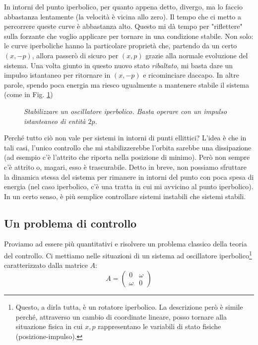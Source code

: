 \documentclass[a4paper,openany]{article}
\begin{document}
	In intorni del punto iperbolico, per quanto appena detto, divergo, ma lo faccio abbastanza lentamente (la velocità è vicina allo zero). Il tempo che ci metto a percorrere queste curve è abbastanza alto. Questo mi dà tempo per "riflettere" sulla forzante che voglio applicare per tornare in una condizione stabile.
	Non solo: le curve iperboliche hanno la particolare proprietà che, partendo da un certo $(x,-p)$, allora passerò di sicuro per $(x,p)$ grazie alla normale evoluzione del sistema. Una volta giunto in questo nuovo stato \textit{ribaltato}, mi basta dare un impulso istantaneo per ritornare in $(x,-p)$ e ricominciare daccapo. In altre parole, spendo poca energia ma riesco ugualmente a mantenere stabile il sistema (come in Fig. \ref{TeoriaContr})
	
	\begin{figure}[H]
		\centering
		\label{TeoriaContr}
		\caption{\textit{Stabilizzare un oscillatore iperbolico. Basta operare con un impulso istanteaneo di entità $2p$.}}
	\end{figure}
	
	
	
	
	Perché tutto ciò non vale per sistemi in intorni di punti ellittici? L'idea è che in tali casi, l'unico controllo che mi stabilizzerebbe l'orbita sarebbe una dissipazione (ad esempio c'è l'attrito che riporta nella posizione di minimo). Però non sempre c'è attrito o, magari, esso è trascurabile. Detto in breve, non possiamo sfruttare la dinamica stessa del sistema per rimanere in intorni del punto con poca spesa di energia (nel caso iperbolico, c'è una tratta in cui mi avvicino al punto iperbolico). In un certo senso, è più semplice controllare sistemi instabili che sistemi stabili.
	\subsection{Un problema di controllo}
	Proviamo ad essere più quantitativi e risolvere un problema classico della teoria del controllo. Ci mettiamo nelle situazioni di un sistema ad oscillatore iperbolico\footnote{Questo, a dirla tutta, è un rotatore iperbolico. La descrizione però è simile perché, attraverso un cambio di coordinate lineare, posso tornare alla situazione fisica in cui $x,p$ rappresentano le variabili di stato fisiche (posizione-impulso).} caratterizzato dalla matrice $A$:
	\begin{equation}
		A = 
		\begin{pmatrix}
			0 & \omega \\
			\omega & 0
		\end{pmatrix}
	\end{equation}
	
\end{document}

